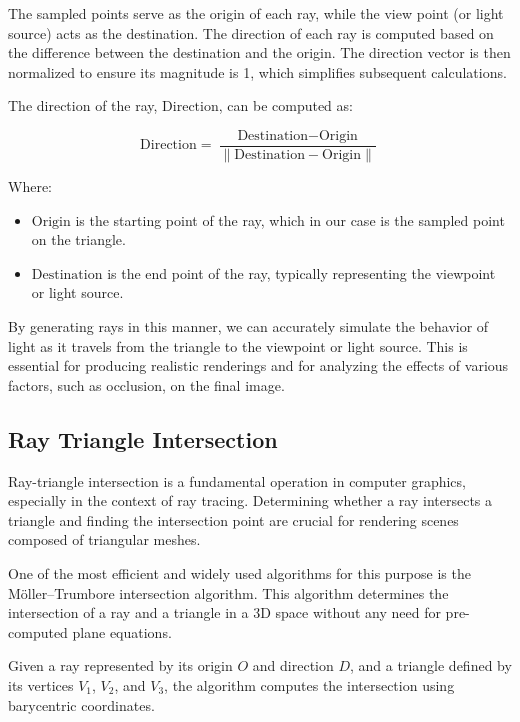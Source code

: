 \documentclass[11pt, a4paper,oneside,chapterprefix=false]{scrbook}
\begin{document}
The sampled points serve as the origin of each ray, while the view point (or light source) acts as the destination. The direction of each ray is computed based on the difference between the destination and the origin. The direction vector is then normalized to ensure its magnitude is 1, which simplifies subsequent calculations.

The direction of the ray, \( \text{Direction} \), can be computed as:

\begin{equation}
	\text{Direction} = \frac{\text{Destination} - \text{Origin}}{\|\text{Destination} - \text{Origin}\|}
\end{equation}

Where:
\begin{itemize}
    \item \(\text{Origin}\) is the starting point of the ray, which in our case is the sampled point on the triangle.
    \item \(\text{Destination}\) is the end point of the ray, typically representing the viewpoint or light source.
\end{itemize}

By generating rays in this manner, we can accurately simulate the behavior of light as it travels from the triangle to the viewpoint or light source. This is essential for producing realistic renderings and for analyzing the effects of various factors, such as occlusion, on the final image.


\subsection{Ray Triangle Intersection}

Ray-triangle intersection is a fundamental operation in computer graphics, especially in the context of ray tracing. Determining whether a ray intersects a triangle and finding the intersection point are crucial for rendering scenes composed of triangular meshes.

One of the most efficient and widely used algorithms for this purpose is the Möller–Trumbore intersection algorithm. This algorithm determines the intersection of a ray and a triangle in a 3D space without any need for pre-computed plane equations.

Given a ray represented by its origin \( O \) and direction \( D \), and a triangle defined by its vertices \( V_1 \), \( V_2 \), and \( V_3 \), the algorithm computes the intersection using barycentric coordinates.
\end{document}
